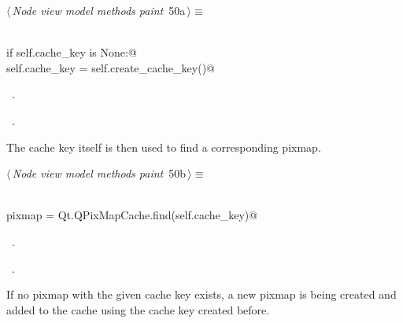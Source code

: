 \documentclass[
    a4paper,      %
    10pt,         %
    openright,    %
    notitlepage,  %
    parskip=half, %
]{scrreprt}       %
\theoremstyle{definition}                    %
\begin{document}
\begin{flushleft} \small
\begin{minipage}{\linewidth}\label{scrap69}\raggedright\small
{} $\langle\,${\itshape Node view model methods paint}\nobreak\ {\footnotesize {50a}}$\,\rangle\equiv$
\vspace{-1exm}
\begin{list}{}{} \item
\mbox{}\lstinline@@\\
\mbox{}\lstinline@    if self.cache_key is None:@\\
\mbox{}\lstinline@        self.cache_key = self.create_cache_key()@\\
\mbox{}\lstinline@@{\NWsep}
\end{list}
\vspace{-1.5ex}
\footnotesize
\begin{list}{}{\setlength{\itemsep}{-\parsep}\setlength{\itemindent}{-\leftmargin}}
\item \NWtxtMacroDefBy\ .
\item \NWtxtMacroRefIn\ .

\item{}
\end{list}
\end{minipage}\vspace{4ex}
\end{flushleft}
The cache key itself is then used to find a corresponding pixmap.

\begin{flushleft} \small
\begin{minipage}{\linewidth}\label{scrap70}\raggedright\small
{} $\langle\,${\itshape Node view model methods paint}\nobreak\ {\footnotesize {50b}}$\,\rangle\equiv$
\vspace{-1exm}
\begin{list}{}{} \item
\mbox{}\lstinline@@\\
\mbox{}\lstinline@    pixmap = Qt.QPixMapCache.find(self.cache_key)@\\
\mbox{}\lstinline@@{\NWsep}
\end{list}
\vspace{-1.5ex}
\footnotesize
\begin{list}{}{\setlength{\itemsep}{-\parsep}\setlength{\itemindent}{-\leftmargin}}
\item \NWtxtMacroDefBy\ .
\item \NWtxtMacroRefIn\ .

\item{}
\end{list}
\end{minipage}\vspace{4ex}
\end{flushleft}
If no pixmap with the given cache key exists, a new pixmap is being created and
added to the cache using the cache key created before.
\end{document}
